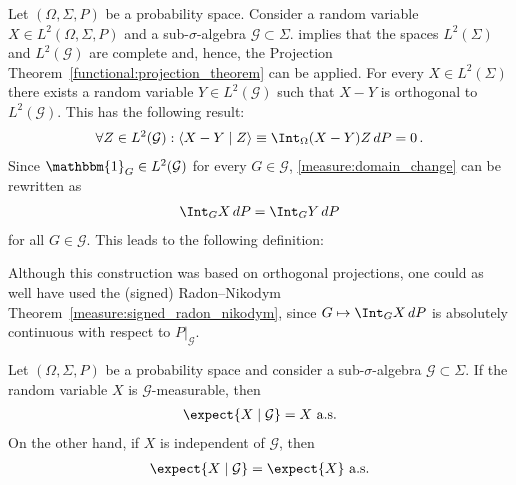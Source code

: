     Let $(\Omega,\Sigma,P)$ be a probability space. Consider a random variable $X\in L^2(\Omega,\Sigma,P)$ and a sub-$\sigma$-algebra $\mathcal{G}\subset\Sigma$.  implies that the spaces $L^2(\Sigma)$ and $L^2(\mathcal{G})$ are complete and, hence, the Projection Theorem~\ref{functional:projection_theorem} can be applied. For every $X\in L^2(\Sigma)$ there exists a random variable $Y\in L^2(\mathcal{G})$ such that $X-Y$ is orthogonal to $L^2(\mathcal{G})$. This has the following result:
    \begin{gather}
        \forall Z\in L^2(\mathcal{G}):\langle X-Y\mid Z \rangle\equiv\Int_\Omega(X-Y)Z\,dP = 0\,.
    \end{gather}
    Since $\mathbbm{1}_G\in L^2(\mathcal{G})$ for every $G\in\mathcal{G}$, \cref{measure:domain_change} can be rewritten as
    \begin{gather}
        \label{prob:conditional_expectation_condition}
        \Int_GX\,dP = \Int_GY\,dP
    \end{gather}
    for all $G\in\mathcal{G}$. This leads to the following definition:
    \begin{remark}
        Although this construction was based on orthogonal projections, one could as well have used the (signed) Radon--Nikodym Theorem~\ref{measure:signed_radon_nikodym}, since $G\mapsto\Int_GX\,dP$ is absolutely continuous with respect to $P|_{\mathcal{G}}$.
    \end{remark}

    \begin{property}\label{prob:conditional_expectation_props}
        Let $(\Omega,\Sigma,P)$ be a probability space and consider a sub-$\sigma$-algebra $\mathcal{G}\subset\Sigma$. If the random variable $X$ is $\mathcal{G}$-measurable, then
        \begin{gather}
            \expect{X\mid\mathcal{G}} = X\text{ a.s.}
        \end{gather}
        On the other hand, if $X$ is independent of $\mathcal{G}$, then
        \begin{gather}
            \expect{X\mid\mathcal{G}} = \expect{X}\text{ a.s.}
        \end{gather}
    \end{property}

